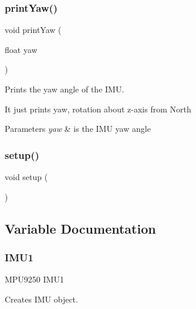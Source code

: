 \subsubsection{print\+Yaw()}
{\footnotesize\ttfamily void print\+Yaw (\begin{DoxyParamCaption}\item[{float}]{yaw }\end{DoxyParamCaption})}



Prints the yaw angle of the I\+MU. 

It just prints yaw, rotation about z-\/axis from North 
\begin{DoxyParams}{Parameters}
{\em yaw} & is the I\+MU yaw angle \\
\hline
\end{DoxyParams}
\mbox{\label{_sat_trackr__combined__sketch_8c_a4fc01d736fe50cf5b977f755b675f11d}} 
\subsubsection{setup()}
{\footnotesize\ttfamily void setup (\begin{DoxyParamCaption}{ }\end{DoxyParamCaption})}



\subsection{Variable Documentation}
\mbox{\label{_sat_trackr__combined__sketch_8c_ad9fc3f567ec1359fe73d406a150cd785}} 
\subsubsection{I\+M\+U1}
{\footnotesize\ttfamily M\+P\+U9250 I\+M\+U1}



Creates I\+MU object. 

\mbox{\label{_sat_trackr__combined__sketch_8c_a09d4740c930d56ab6ceebc10a09d679e}} 
